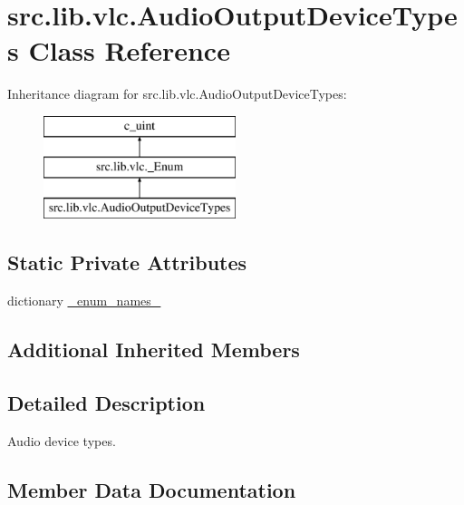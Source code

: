 \hypertarget{classsrc_1_1lib_1_1vlc_1_1AudioOutputDeviceTypes}{}\section{src.\+lib.\+vlc.\+Audio\+Output\+Device\+Types Class Reference}
\label{classsrc_1_1lib_1_1vlc_1_1AudioOutputDeviceTypes}
Inheritance diagram for src.\+lib.\+vlc.\+Audio\+Output\+Device\+Types\+:\begin{figure}[H]
\begin{center}
\leavevmode
\includegraphics[height=3.000000cm]{classsrc_1_1lib_1_1vlc_1_1AudioOutputDeviceTypes}
\end{center}
\end{figure}
\subsection*{Static Private Attributes}
\begin{DoxyCompactItemize}
\item 
dictionary \hyperlink{classsrc_1_1lib_1_1vlc_1_1AudioOutputDeviceTypes_a8a1417d077523d4052c95707a6f1a16d}{\+\_\+enum\+\_\+names\+\_\+}
\end{DoxyCompactItemize}
\subsection*{Additional Inherited Members}


\subsection{Detailed Description}
\begin{DoxyVerb}Audio device types.
\end{DoxyVerb}
 

\subsection{Member Data Documentation}
\hypertarget{classsrc_1_1lib_1_1vlc_1_1AudioOutputDeviceTypes_a8a1417d077523d4052c95707a6f1a16d}{}

